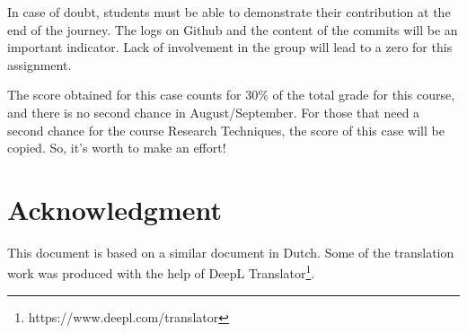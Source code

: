 \documentclass[fleqn,10pt]{artikeltin}
\begin{document}
In case of doubt, students must be able to demonstrate their contribution at the end of the journey. The logs on Github and the content of the commits will be an important indicator. Lack of involvement in the group will lead to a zero for this assignment.

The score obtained for this case counts for 30\% of the total grade for this course, and there is no second chance in August/September. For those that need a second chance for the course Research Techniques, the score of this case will be copied. So, it's worth to make an effort!

\section{Acknowledgment}
This document is based on a similar document in Dutch. Some of the translation work was produced with the help of DeepL Translator\footnote{https://www.deepl.com/translator}.


\printbibliography[heading=bibintoc]
\end{document}
